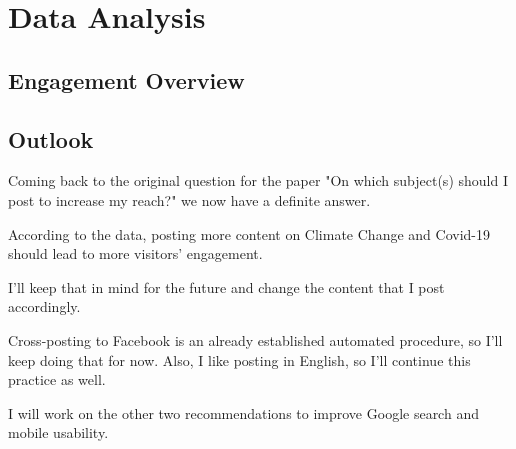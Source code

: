 %
%

\pagebreak
\section{Data Analysis}

\onehalfspacing

\subsection{Engagement Overview}


\subsection{Outlook}

Coming back to the original question for the paper "On which subject(s) should I post to increase my reach?" we now have a definite answer.

According to the data, posting more content on Climate Change and Covid-19 should lead to more visitors' engagement.

I'll keep that in mind for the future and change the content that I post accordingly.

Cross-posting to Facebook is an already established automated procedure, so I'll keep doing that for now. Also, I like posting in English, so I'll continue this practice as well.

I will work on the other two recommendations to improve Google search and mobile usability.


